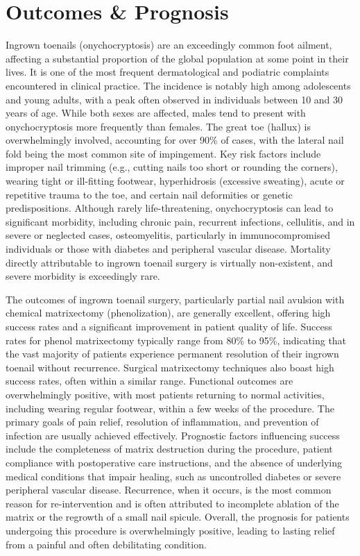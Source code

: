 \section*{Outcomes \& Prognosis}
Ingrown toenails (onychocryptosis) are an exceedingly common foot ailment, affecting a substantial proportion of the global population at some point in their lives. It is one of the most frequent dermatological and podiatric complaints encountered in clinical practice. The incidence is notably high among adolescents and young adults, with a peak often observed in individuals between 10 and 30 years of age. While both sexes are affected, males tend to present with onychocryptosis more frequently than females. The great toe (hallux) is overwhelmingly involved, accounting for over 90\% of cases, with the lateral nail fold being the most common site of impingement. Key risk factors include improper nail trimming (e.g., cutting nails too short or rounding the corners), wearing tight or ill-fitting footwear, hyperhidrosis (excessive sweating), acute or repetitive trauma to the toe, and certain nail deformities or genetic predispositions. Although rarely life-threatening, onychocryptosis can lead to significant morbidity, including chronic pain, recurrent infections, cellulitis, and in severe or neglected cases, osteomyelitis, particularly in immunocompromised individuals or those with diabetes and peripheral vascular disease. Mortality directly attributable to ingrown toenail surgery is virtually non-existent, and severe morbidity is exceedingly rare.

The outcomes of ingrown toenail surgery, particularly partial nail avulsion with chemical matrixectomy (phenolization), are generally excellent, offering high success rates and a significant improvement in patient quality of life. Success rates for phenol matrixectomy typically range from 80\% to 95\%, indicating that the vast majority of patients experience permanent resolution of their ingrown toenail without recurrence. Surgical matrixectomy techniques also boast high success rates, often within a similar range. Functional outcomes are overwhelmingly positive, with most patients returning to normal activities, including wearing regular footwear, within a few weeks of the procedure. The primary goals of pain relief, resolution of inflammation, and prevention of infection are usually achieved effectively. Prognostic factors influencing success include the completeness of matrix destruction during the procedure, patient compliance with postoperative care instructions, and the absence of underlying medical conditions that impair healing, such as uncontrolled diabetes or severe peripheral vascular disease. Recurrence, when it occurs, is the most common reason for re-intervention and is often attributed to incomplete ablation of the matrix or the regrowth of a small nail spicule. Overall, the prognosis for patients undergoing this procedure is overwhelmingly positive, leading to lasting relief from a painful and often debilitating condition.

